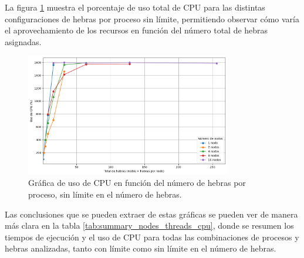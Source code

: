 La figura \ref{fig:exploratory_threads_no-limit_cpu} muestra el porcentaje de uso total de CPU para las distintas configuraciones de hebras por proceso sin límite, permitiendo observar cómo varía el aprovechamiento de los recursos en función del número total de hebras asignadas.

\begin{figure}[ht]
    \centering
    \includegraphics[width=0.8\textwidth]{imagenes/cap5/exploratory_threads_no-limit_cpu.png}
    \caption{Gráfica de uso de CPU en función del número de hebras por proceso, sin límite en el número de hebras.}
    \label{fig:exploratory_threads_no-limit_cpu}
\end{figure}

Las conclusiones que se pueden extraer de estas gráficas se pueden ver de manera más clara en la tabla \ref{tab:summary_nodes_threads_cpu}, donde se resumen los tiempos de ejecución y el uso de CPU para todas las combinaciones de procesos y hebras analizadas, tanto con límite como sin límite en el número de hebras.


